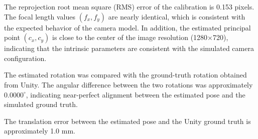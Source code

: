 \documentclass[conference]{IEEEtran}
\begin{document}

The reprojection root mean square (RMS) error of the calibration is 0.153 pixels. The focal length values $(f_x, f_y)$ are nearly identical, which is consistent with the expected behavior of the camera model. In addition, the estimated principal point $(c_x, c_y)$ is close to the center of the image resolution (1280×720), indicating that the intrinsic parameters are consistent with the simulated camera configuration.



The estimated rotation was compared with the ground-truth rotation obtained from Unity. The angular difference between the two rotations was approximately $0.0000^\circ$, indicating near-perfect alignment between the estimated pose and the simulated ground truth.



The translation error between the estimated pose and the Unity ground truth is approximately 1.0 mm.

\end{document}
